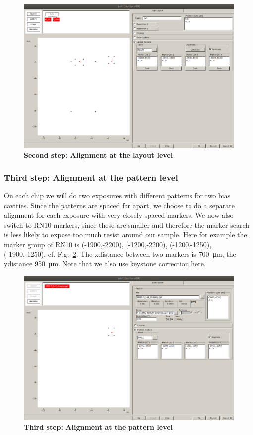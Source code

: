 \begin{figure}
	\centering
	\includegraphics[width=\linewidth]{appendix/figs/ebeam3}
	\caption{\textbf{Second step: Alignment at the layout level}}
	\label{fig:ebeam3}
\end{figure}

\subsubsection{Third step: Alignment at the pattern level}
%
On each chip we will do two exposures with different patterns for two bias cavities. 
%
Since the patterns are spaced far apart, we choose to do a separate alignment for each exposure with very closely spaced markers. 
%
We now also switch to RN10 markers, since these are smaller and therefore the marker search is less likely to expose too much resist around our sample. 
%
Here for example the marker group of RN10 is (-1900,-2200), (-1200,-2200), (-1200,-1250), (-1900,-1250), cf. Fig.~\ref{fig:ebeam4}.
%
The xdistance between two markers is \SI{700}{\micro\meter}, the ydistance \SI{950}{\micro\meter}. 
%
Note that we also use keystone correction here.

\begin{figure}
	\centering
	\includegraphics[width=\linewidth]{appendix/figs/ebeam4}
	\caption{\textbf{Third step: Alignment at the pattern level}}
	\label{fig:ebeam4}
\end{figure}


